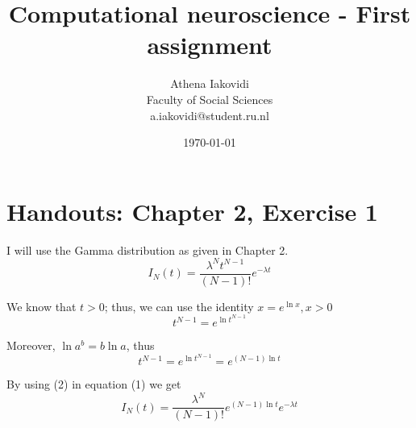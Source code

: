 \documentclass[notitlepage,12pt]{article}
\begin{document}
	
	
	\title{Computational neuroscience - First assignment}
	\date{\today}
	
	\author{{\large Athena Iakovidi}\\Faculty of Social Sciences\\a.iakovidi@student.ru.nl}
	
	\maketitle
	
	\newcommand{\Laplace}{\mathcal{L}}
	
	\section*{Handouts: Chapter 2, Exercise 1}
	I will use the Gamma distribution as given in Chapter 2.
	\begin{equation}
	I_N(t) = \dfrac{\lambda^Nt^{N-1}}{(N-1)!}e^{-\lambda t}
	\end{equation}
	
	We know that $t > 0$; thus, we can use the identity $x = e^{\ln x}, x > 0$
	\begin{equation*}
	t^{N-1} = e^{\ln t^{N-1}}
	\end{equation*}
	
	Moreover, $\ln a^b = b \ln a$, thus
	\begin{equation}
	t^{N-1} = e^{\ln t^{N-1}} = e^{(N-1)\ln t}
	\end{equation}
	
	By using (2) in equation (1) we get
	\begin{equation*}
	I_N(t) = \dfrac{\lambda^N}{(N-1)!} e^{(N-1)\ln t} e^{-\lambda t}
	\end{equation*}
	
\end{document}
